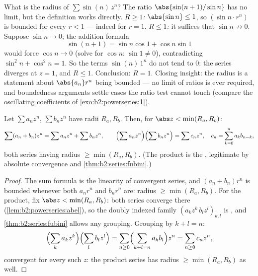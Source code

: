 \begin{example}\label{ex:b2:powerseries:sinn}
What is the radius of $\sum \sin(n)\,z^n$? The ratio
$\abs{\sin(n+1)/\sin n}$ has no limit, but the definition works
directly. \emph{$R \geq 1$:} $\abs{\sin n} \leq 1$, so $(\sin
n\cdot r^n)$ is bounded for every $r < 1$ --- indeed for $r =
1$. \emph{$R \leq 1$:} it suffices that $\sin n \not\to 0$.
Suppose $\sin n \to 0$; the addition formula
\[
\sin(n+1) = \sin n\cos 1 + \cos n\sin 1
\]
would force $\cos n \to 0$ (solve for $\cos n$: $\sin 1 \neq
0$), contradicting $\sin^2 n + \cos^2 n = 1$. So the terms
$\sin(n)\,1^n$ do not tend to $0$: the series diverges at $z =
1$, and $R \leq 1$. Conclusion: $R = 1$. Closing insight: the
radius is a statement about $\abs{a_n}r^n$ being bounded ---
no limit of ratios is ever required, and boundedness arguments
settle cases the ratio test cannot touch (compare the
oscillating coefficients of \cref{exo:b2:powerseries:1}).
\end{example}

\begin{proposition}[Operations]\label{prop:b2:powerseries:operations}
Let $\sum a_nz^n$, $\sum b_nz^n$ have radii $R_a, R_b$. Then, for
$\abs z < \min(R_a, R_b)$:
\[
\sum (a_n + b_n)z^n = \sum a_nz^n + \sum b_nz^n,
\qquad
\Bigl(\sum a_nz^n\Bigr)\Bigl(\sum b_nz^n\Bigr) = \sum c_n z^n,
\quad c_n = \sum_{k=0}^{n} a_kb_{n-k},
\]
both series having radius $\geq \min(R_a, R_b)$. (The product is
the , legitimate by absolute convergence and
\cref{thm:b2:series:fubini}.)
\end{proposition}

\begin{proof}
The sum formula is the linearity of convergent series, and
$(a_n + b_n)r^n$ is bounded whenever both $a_nr^n$ and $b_nr^n$
are: radius $\geq \min(R_a, R_b)$. For the product, fix $\abs z
< \min(R_a, R_b)$: both series converge \emph{}
there (\cref{lem:b2:powerseries:abel}), so the doubly indexed
family $(a_kz^k\,b_lz^l)_{k,l}$ is , and
\cref{thm:b2:series:fubini} allows any grouping. Grouping by $k
+ l = n$:
\[
\Bigl(\sum_k a_kz^k\Bigr)\Bigl(\sum_l b_lz^l\Bigr)
= \sum_{n\geq0}\Bigl(\sum_{k+l=n}a_kb_l\Bigr)z^n
= \sum_{n\geq0}c_nz^n ,
\]
 convergent for every such $z$: the product series
has radius $\geq \min(R_a, R_b)$ as well.
\end{proof}

